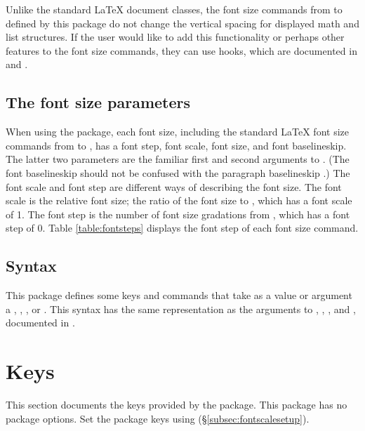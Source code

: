 \documentclass{beery}
\begin{document}
Unlike the standard \LaTeX{} document classes, the font size commands from  to  defined by this package do not change the vertical spacing for displayed math and list structures.
If the user would like to add this functionality or perhaps other features to the font size commands, they can use hooks, which are documented in  and .

\subsection{The font size parameters}
\label{subsec:fontsizeparameters}

When using the  package, each font size, including the standard \LaTeX{} font size commands from  to , has a font step, font scale, font size, and font baselineskip.
The latter two parameters are the familiar first and second arguments to .
(The font baselineskip should not be confused with the paragraph baselineskip .)
The font scale and font step are different ways of describing the font size.
The font scale is the relative font size; the ratio of the font size to , which has a font scale of \num{1}.
The font step is the number of font size gradations from , which has a font step of \num{0}.
Table \ref{table:fontsteps} displays the font step of each font size command.



\subsection{Syntax}
\label{subsec:syntax}

This package defines some keys and commands that take as a value or argument a , , , or .
This syntax has the same representation as the arguments to , , , and , documented in .


\section{Keys}
\label{sec:keys}

This section documents the keys provided by the  package.
This package has no package options.
Set the package keys using  (\S\ref{subsec:fontscalesetup}).
\end{document}

